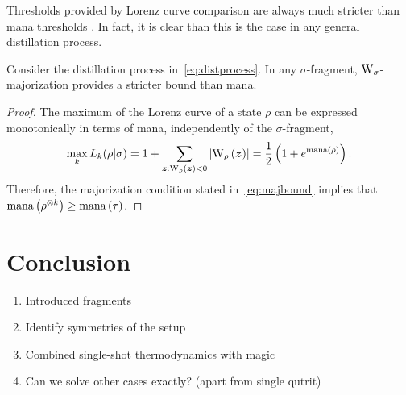\documentclass[pra,
aps,
twocolumn,
superscriptaddress,
groupedaddress,
nofootinbib,
reprint
]{revtex4-1}
\begin{document}
Thresholds provided by Lorenz curve comparison are always much stricter than mana thresholds .
In fact, it is clear than this is the case in any general distillation process.
\begin{theorem}\label{thm:bounds}
    Consider the distillation process in~\cref{eq:distprocess}.
    In any $\sigma$-fragment, $\W{\sigma}$-majorization provides a stricter bound than mana.
\end{theorem}
\begin{proof}
    The maximum of the Lorenz curve of a state $\rho$ can be expressed monotonically in terms of mana, independently of the $\sigma$-fragment,
    \begin{equation}
        \max_k{L_k(\rho | \sigma)} = 1 + \sum_{\bmz: \W[\bmz]{\rho}<0} \abs{\W[\bmz]{\rho}} = \frac{1}{2} \left( 1 + e^\mana{\rho} \right).
    \end{equation}
    Therefore, the majorization condition stated in~\cref{eq:majbound} implies that ${{\rm{mana}}\left(\rho^{\otimes k}\right)} \geq {{\rm{mana}}\left(\tau\right)}$. 
\end{proof}


\section{Conclusion}
\label{sec:conc}

\begin{enumerate}
    \item Introduced fragments
    \item Identify symmetries of the setup
    \item Combined single-shot thermodynamics with magic 
    \item Can we solve other cases exactly? (apart from single qutrit)
\end{enumerate}



%


\appendix

\end{document}
